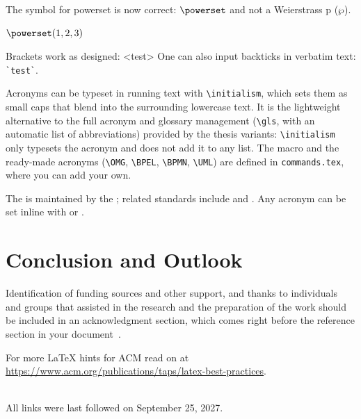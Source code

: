 \begin{ltgexample}
The symbol for powerset is now correct: $\powerset$ and not a Weierstrass p ($\wp$).

$\powerset({1,2,3})$
\end{ltgexample}

\begin{ltgexample}
Brackets work as designed:
<test>
One can also input backticks in verbatim text: \verb|`test`|.
\end{ltgexample}

Acronyms can be typeset in running text with \verb+\initialism+, which sets them as small caps that blend into the surrounding lowercase text. It is the lightweight alternative to the full acronym and glossary management (\verb+\gls+, with an automatic list of abbreviations) provided by the thesis variants: \verb+\initialism+ only typesets the acronym and does not add it to any list. The macro and the ready-made acronyms (\verb+\OMG+, \verb+\BPEL+, \verb+\BPMN+, \verb+\UML+) are defined in \texttt{commands.tex}, where you can add your own.

\begin{ltgexample}
The \UML is maintained by the \OMG; related standards include \BPEL and \BPMN.
Any acronym can be set inline with  or .
\end{ltgexample}


\section{Conclusion and Outlook}
\label{sec:outlook}
\lipsum[1-2]

\begin{acks}
  Identification of funding sources and other support, and thanks to individuals and groups that assisted in the research and the preparation of the work should be included in an acknowledgment section, which comes right before the reference section in your document~\cite{acmart}.

  For more \LaTeX{} hints for ACM read on at \url{https://www.acm.org/publications/taps/latex-best-practices}.
\end{acks}





\ \\
%
\noindent
All links were last followed on September 25, 2027.


